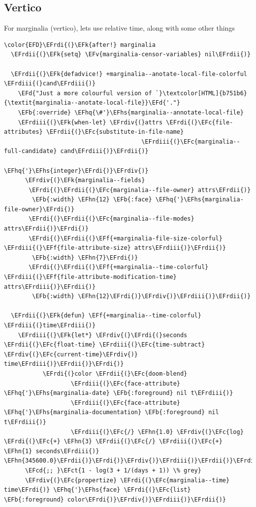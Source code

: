 \documentclass{scrartcl}
\newcommand{\EFk}[1]{\textcolor{EFk}{#1}} %
\newcommand{\EFd}[1]{\textcolor{EFd}{\textit{#1}}} %
\newcommand{\EFb}[1]{\textcolor{EFb}{#1}} %
\newcommand{\EFct}[1]{\textcolor{EFct}{#1}} %
\newcommand{\EFc}[1]{\textcolor{EFc}{#1}} %
\newcommand{\EFv}[1]{\textcolor{EFv}{#1}} %
\newcommand{\EFf}[1]{\textcolor{EFf}{#1}} %
\newcommand{\EFcd}[1]{\textcolor{EFcd}{#1}} %
\newcommand{\EFhn}[1]{\textcolor{EFhn}{\textbf{#1}}} %
\newcommand{\EFhq}[1]{\textcolor{EFhq}{#1}} %
\newcommand{\EFhs}[1]{\textcolor{EFhs}{#1}} %
\newcommand{\EFrdi}[1]{\textcolor{EFrdi}{#1}} %
\newcommand{\EFrdii}[1]{\textcolor{EFrdii}{#1}} %
\newcommand{\EFrdiii}[1]{\textcolor{EFrdiii}{#1}} %
\newcommand{\EFrdiv}[1]{\textcolor{EFrdiv}{#1}} %
\begin{document}
\subsection{Vertico}
\label{sec:org1dc479e}
For marginalia (vertico), lets use relative time, along with some other things
\begin{Code}
\begin{Verbatim}[]
\color{EFD}\EFrdi{(}\EFk{after!} marginalia
  \EFrdii{(}\EFk{setq} \EFv{marginalia-censor-variables} nil\EFrdii{)}

  \EFrdii{(}\EFk{defadvice!} +marginalia--anotate-local-file-colorful \EFrdiii{(}cand\EFrdiii{)}
    \EFd{"Just a more colourful version of `}\textcolor[HTML]{b751b6}{\textit{marginalia--anotate-local-file}}\EFd{'."}
    \EFb{:override} \EFhq{\#'}\EFhs{marginalia--annotate-local-file}
    \EFrdiii{(}\EFk{when-let} \EFrdiv{(}attrs \EFrdi{(}\EFc{file-attributes} \EFrdii{(}\EFc{substitute-in-file-name}
                                       \EFrdiii{(}\EFc{marginalia--full-candidate} cand\EFrdiii{)}\EFrdii{)}
                                      \EFhq{'}\EFhs{integer}\EFrdi{)}\EFrdiv{)}
      \EFrdiv{(}\EFk{marginalia--fields}
       \EFrdi{(}\EFrdii{(}\EFc{marginalia--file-owner} attrs\EFrdii{)}
        \EFb{:width} \EFhn{12} \EFb{:face} \EFhq{'}\EFhs{marginalia-file-owner}\EFrdi{)}
       \EFrdi{(}\EFrdii{(}\EFc{marginalia--file-modes} attrs\EFrdii{)}\EFrdi{)}
       \EFrdi{(}\EFrdii{(}\EFf{+marginalia-file-size-colorful} \EFrdiii{(}\EFf{file-attribute-size} attrs\EFrdiii{)}\EFrdii{)}
        \EFb{:width} \EFhn{7}\EFrdi{)}
       \EFrdi{(}\EFrdii{(}\EFf{+marginalia--time-colorful} \EFrdiii{(}\EFf{file-attribute-modification-time} attrs\EFrdiii{)}\EFrdii{)}
        \EFb{:width} \EFhn{12}\EFrdi{)}\EFrdiv{)}\EFrdiii{)}\EFrdii{)}

  \EFrdii{(}\EFk{defun} \EFf{+marginalia--time-colorful} \EFrdiii{(}time\EFrdiii{)}
    \EFrdiii{(}\EFk{let*} \EFrdiv{(}\EFrdi{(}seconds \EFrdii{(}\EFc{float-time} \EFrdiii{(}\EFc{time-subtract} \EFrdiv{(}\EFc{current-time}\EFrdiv{)} time\EFrdiii{)}\EFrdii{)}\EFrdi{)}
           \EFrdi{(}color \EFrdii{(}\EFc{doom-blend}
                   \EFrdiii{(}\EFc{face-attribute} \EFhq{'}\EFhs{marginalia-date} \EFb{:foreground} nil t\EFrdiii{)}
                   \EFrdiii{(}\EFc{face-attribute} \EFhq{'}\EFhs{marginalia-documentation} \EFb{:foreground} nil t\EFrdiii{)}
                   \EFrdiii{(}\EFc{/} \EFhn{1.0} \EFrdiv{(}\EFc{log} \EFrdi{(}\EFc{+} \EFhn{3} \EFrdii{(}\EFc{/} \EFrdiii{(}\EFc{+} \EFhn{1} seconds\EFrdiii{)} \EFhn{345600.0}\EFrdii{)}\EFrdi{)}\EFrdiv{)}\EFrdiii{)}\EFrdii{)}\EFrdi{)}\EFrdiv{)}
      \EFcd{;; }\EFct{1 - log(3 + 1/(days + 1)) \% grey}
      \EFrdiv{(}\EFc{propertize} \EFrdi{(}\EFc{marginalia--time} time\EFrdi{)} \EFhq{'}\EFhs{face} \EFrdi{(}\EFc{list} \EFb{:foreground} color\EFrdi{)}\EFrdiv{)}\EFrdiii{)}\EFrdii{)}


\end{Verbatim}
\end{Code}
\end{document}
